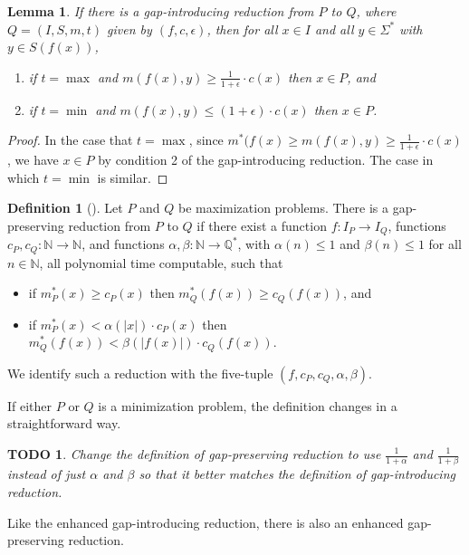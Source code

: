 \documentclass[]{article}
\theoremstyle{plain}
\newtheorem{lemma}{Lemma}
\newtheorem{todo}{TODO}
\theoremstyle{definition}
\newtheorem{definition}{Definition}
\begin{document}
\begin{lemma}\label{lem:xinp}
  If there is a gap-introducing reduction from $P$ to $Q$, where $Q = (I, S, m, t)$ given by $(f, c, \epsilon)$, then for all $x \in I$ and all $y \in \Sigma^*$ with $y \in S(f(x))$,
  \begin{enumerate}
  \item if $t = \max$ and $m(f(x), y) \geq \frac{1}{1 + \epsilon} \cdot c(x)$ then $x \in P$, and
  \item if $t = \min$ and $m(f(x), y) \leq (1 + \epsilon) \cdot c(x)$ then $x \in P$.
  \end{enumerate}
\end{lemma}
\begin{proof}
  In the case that $t = \max$, since $m^*(f(x) \geq m(f(x), y) \geq \frac{1}{1 + \epsilon} \cdot c(x)$, we have $x \in P$ by condition 2 of the gap-introducing reduction.
  The case in which $t = \min$ is similar.
\end{proof}

\begin{definition}[{\cite[Section~29.1]{vazirani}}]
  Let $P$ and $Q$ be maximization problems.
  There is a gap-preserving reduction from $P$ to $Q$ if there exist a function $f \colon I_P \to I_Q$, functions $c_P, c_Q \colon \mathbb{N} \to \mathbb{N}$, and functions $\alpha, \beta \colon \mathbb{N} \to \mathbb{Q}^*$, with $\alpha(n) \leq 1$ and $\beta(n) \leq 1$ for all $n \in \mathbb{N}$, all polynomial time computable, such that
  \begin{itemize}
  \item if $m^*_P(x) \geq c_P(x)$ then $m^*_Q(f(x)) \geq c_Q(f(x))$, and
  \item if $m^*_P(x) < \alpha(|x|) \cdot c_P(x)$ then $m^*_Q(f(x)) < \beta(|f(x)|) \cdot c_Q(f(x))$.
  \end{itemize}
  We identify such a reduction with the five-tuple $(f, c_P, c_Q, \alpha, \beta)$.

  If either $P$ or $Q$ is a minimization problem, the definition changes in a straightforward way.
\end{definition}

\begin{todo}
  Change the definition of gap-preserving reduction to use $\frac{1}{1 +\alpha}$ and $\frac{1}{1 + \beta}$ instead of just $\alpha$ and $\beta$ so that it better matches the definition of gap-introducing reduction.
\end{todo}

Like the enhanced gap-introducing reduction, there is also an enhanced gap-preserving reduction.
\end{document}

